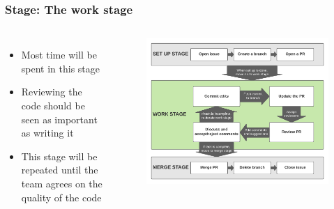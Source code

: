 \documentclass[aspectratio=169]{beamer} %
\begin{document}
\begin{frame}
	\frametitle{Stage: The work stage}
	\begin{columns}[c]
		
		\begin{itemize}
			\setlength\itemsep{1em}
			\item Most time will be spent in this stage
			\item Reviewing the code should be seen as important as writing it
			\item This stage will be repeated until the team agrees on the quality of the code
		\end{itemize}
		
		\vspace{-.75cm}
		\begin{figure}
			\centering
			\includegraphics[width=\textwidth]{./img/branch-pr-merge-cycle-S2.png}
		\end{figure}
		
	\end{columns}
\end{frame}
\end{document}
